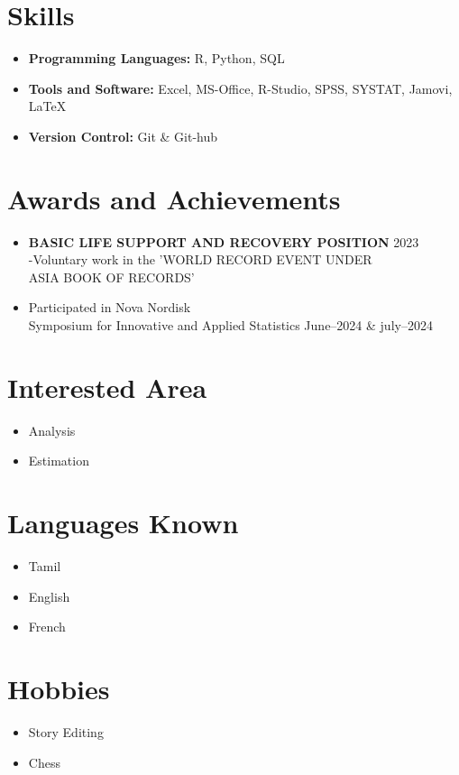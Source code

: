 \documentclass[a4paper,11pt]{article}
\begin{document}
	\section*{Skills}
	\begin{itemize}
		\item \textbf{Programming Languages:}  R, Python, SQL
		\item \textbf{Tools and Software:} Excel, MS-Office,
		R-Studio, SPSS, SYSTAT, Jamovi, \LaTeX
		\item \textbf{Version Control:} Git \& Git-hub
		
	\end{itemize}
	
	
	\section*{Awards and Achievements}
	\noindent
	\begin{itemize}
		\item 
		\textbf{BASIC LIFE SUPPORT AND RECOVERY POSITION} \hfill 2023 \\
		-Voluntary work in the 'WORLD RECORD EVENT UNDER \\ ASIA BOOK OF RECORDS'
		\item  Participated in Nova Nordisk \\ Symposium for Innovative and Applied Statistics \hfill June--2024 \& july--2024
	\end{itemize} 
	\section*{Interested Area}
	\begin{itemize}
		\item Analysis 
		\item Estimation 
	\end{itemize}
	\section*{Languages Known}
	\begin{itemize}
		\item Tamil 
		\item English 
		\item French
		
	\end{itemize}
	\section*{Hobbies}
	\begin{itemize}
		\item Story Editing
		\item Chess
	\end{itemize}
\end{document}

